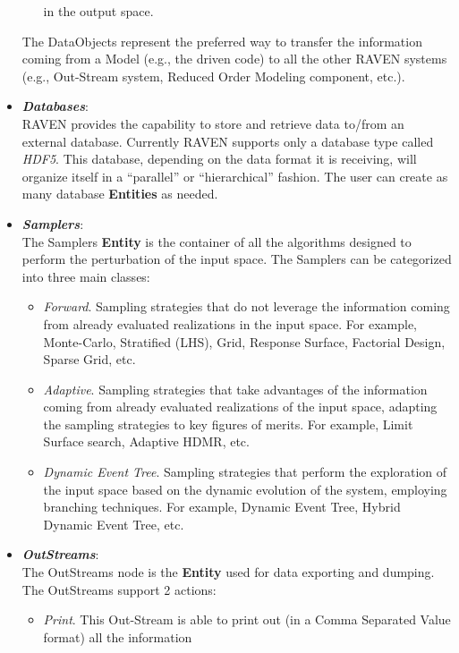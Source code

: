 \begin{itemize}
\begin{itemize}
                                               in the output space.
     \end{itemize}
     The DataObjects represent the preferred way to transfer the information coming from a Model (e.g., the driven code) to
      all the other RAVEN systems (e.g., Out-Stream system, Reduced Order Modeling component, etc.). 
  \item \textit{\textbf{Databases}}:
      \\ RAVEN provides the capability to store and retrieve data to/from an external database. Currently RAVEN supports
       only a database type called \textit{HDF5}. This database, depending on the data format it is receiving, will 
       organize itself in a ``parallel'' or ``hierarchical'' fashion. The user can create as many database \textbf{Entities} as needed. 
  \item \textit{\textbf{Samplers}}:
  \\ The Samplers  \textbf{Entity} is the container of all the algorithms designed to perform the perturbation of the input space.
      The Samplers can be categorized into three main classes:
      \begin{itemize}
        \item  \textit{Forward}. Sampling strategies that do not leverage the information coming from already evaluated 
        realizations in the input space. For example, Monte-Carlo, Stratified (LHS), Grid, Response Surface, Factorial Design, 
        Sparse Grid, etc.
        \item  \textit{Adaptive}. Sampling strategies that take advantages of the information coming from already evaluated 
        realizations of the input space, adapting the sampling strategies to key figures of merits. For example, Limit Surface 
        search, Adaptive HDMR, etc.
        \item \textit{Dynamic Event Tree}. Sampling strategies that perform the exploration of the input space based on the 
        dynamic evolution of the system, employing branching techniques. For example, Dynamic Event Tree, Hybrid 
        Dynamic Event Tree, etc.
      \end{itemize}
  \item \textit{\textbf{OutStreams}}:
  \\ The OutStreams node is the \textbf{Entity} used for data exporting and dumping. The OutStreams support
   2 actions:
      \begin{itemize}
       \item \textit{Print}. This Out-Stream is able to print out (in a Comma Separated Value format) all the information 

\end{itemize}
\end{itemize}
